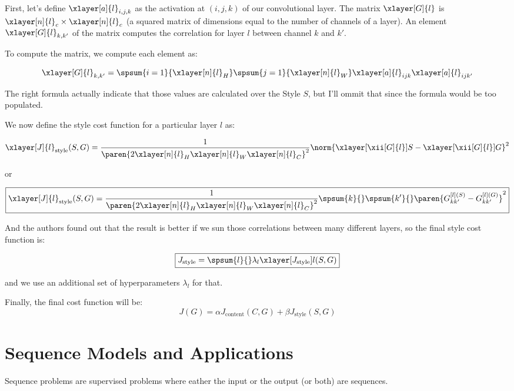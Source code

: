 \documentclass[12pt, a4paper, oneside]{book}
\begin{document}
First, let's define $\xlayer[a]{l}_{i,j,k}$ as the activation at $(i,j,k)$ of
our convolutional layer. The matrix $\xlayer[G]{l}$ is
$\xlayer[n]{l}_c\times\xlayer[n]{l}_c$ (a squared matrix of dimensions equal to
the number of channels of a layer). An element $\xlayer[G]{l}_{k,k'}$ of the
matrix computes the correlation for layer $l$ between channel $k$ and $k'$.

To compute the matrix, we compute each element as:

\[
\xlayer[G]{l}_{k,k'}=\spsum{i=1}{\xlayer[n]{l}_H}\spsum{j=1}{\xlayer[n]{l}_W}
\xlayer[a]{l}_{ijk} \xlayer[a]{l}_{ijk'}
\]

\begin{obs}
The right formula actually indicate that those values are calculated over the
Style $S$, but I'll ommit that since the formula would be too populated.
\end{obs}

We now define the style cost function for a particular layer $l$ as:

\[
\xlayer[J]{l}_{\text{style}}(S,G)=
\dfrac{1}{\paren{2\xlayer[n]{l}_H\xlayer[n]{l}_W\xlayer[n]{l}_C}^2}
\norm{\xlayer[\xii[G]{l}]{S}-\xlayer[\xii[G]{l}]{G}}^2
\]

or

\[ \boxed{
\xlayer[J]{l}_{\text{style}}(S,G)=
\dfrac{1}{\paren{2\xlayer[n]{l}_H\xlayer[n]{l}_W\xlayer[n]{l}_C}^2}
\spsum{k}{}\spsum{k'}{}
\paren{G_{kk'}^{[l](S)}-G_{kk'}^{[l](G)}}^2
}\]

And the authors found out that the result is better if we sun those correlations
between many different layers, so the final style cost function is:

\[ \boxed{
    J_{\text{style}}=\spsum{l}{}\lambda_l \xlayer[J_{\text{style}}]{l}(S,G)
}\]

and we use an additional set of hyperparameters $\lambda_l$ for that.

Finally, the final cost function will be:
\[ \boxed{
J(G) = \alpha J_{\text{content}}(C, G) + \beta J_{\text{style}}(S, G)
}\]


\chapter{Sequence Models and Applications}%
\label{cha:sequence_models_and_applications}

Sequence problems are supervised problems where eather the input or the output
(or both) are sequences.
\end{document}
